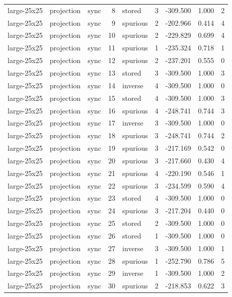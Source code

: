 \begin{tabular}{lllrlrrrr}
large-25x25 & projection & sync & 8 & stored & 3 & -309.500 & 1.000 & 2 \\
large-25x25 & projection & sync & 9 & spurious & 2 & -202.966 & 0.414 & 4 \\
large-25x25 & projection & sync & 10 & spurious & 2 & -229.829 & 0.699 & 4 \\
large-25x25 & projection & sync & 11 & spurious & 1 & -235.324 & 0.718 & 1 \\
large-25x25 & projection & sync & 12 & spurious & 2 & -237.201 & 0.555 & 0 \\
large-25x25 & projection & sync & 13 & stored & 3 & -309.500 & 1.000 & 3 \\
large-25x25 & projection & sync & 14 & inverse & 4 & -309.500 & 1.000 & 0 \\
large-25x25 & projection & sync & 15 & stored & 4 & -309.500 & 1.000 & 3 \\
large-25x25 & projection & sync & 16 & spurious & 4 & -248.741 & 0.744 & 3 \\
large-25x25 & projection & sync & 17 & inverse & 3 & -309.500 & 1.000 & 0 \\
large-25x25 & projection & sync & 18 & spurious & 3 & -248.741 & 0.744 & 2 \\
large-25x25 & projection & sync & 19 & spurious & 3 & -217.169 & 0.542 & 0 \\
large-25x25 & projection & sync & 20 & spurious & 3 & -217.660 & 0.430 & 4 \\
large-25x25 & projection & sync & 21 & spurious & 4 & -220.190 & 0.546 & 1 \\
large-25x25 & projection & sync & 22 & spurious & 3 & -234.599 & 0.590 & 4 \\
large-25x25 & projection & sync & 23 & stored & 4 & -309.500 & 1.000 & 0 \\
large-25x25 & projection & sync & 24 & spurious & 3 & -217.204 & 0.440 & 0 \\
large-25x25 & projection & sync & 25 & stored & 2 & -309.500 & 1.000 & 0 \\
large-25x25 & projection & sync & 26 & stored & 1 & -309.500 & 1.000 & 0 \\
large-25x25 & projection & sync & 27 & inverse & 3 & -309.500 & 1.000 & 1 \\
large-25x25 & projection & sync & 28 & spurious & 1 & -252.790 & 0.786 & 5 \\
large-25x25 & projection & sync & 29 & inverse & 1 & -309.500 & 1.000 & 2 \\
large-25x25 & projection & sync & 30 & spurious & 2 & -218.853 & 0.622 & 3 \\

\end{tabular}
